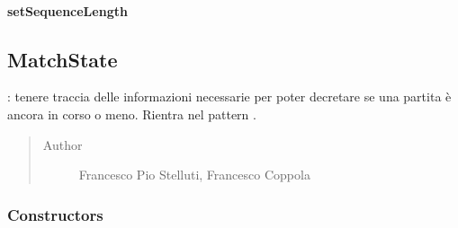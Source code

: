\documentclass[letterpaper,10pt,italian,openany,oneside]{sphinxmanual}
\begin{document}
\paragraph{setSequenceLength}
\label{\detokenize{source/it/unicam/cs/pa/mastermind/gamecore/MatchStartSettings:setsequencelength}}

\begin{fulllineitems}
\label{\detokenize{source/it/unicam/cs/pa/mastermind/gamecore/MatchStartSettings:it.unicam.cs.pa.mastermind.gamecore.MatchStartSettings.setSequenceLength(int)}}
\end{fulllineitems}



\subsection{MatchState}
\label{\detokenize{source/it/unicam/cs/pa/mastermind/gamecore/MatchState:matchstate}}\label{\detokenize{source/it/unicam/cs/pa/mastermind/gamecore/MatchState::doc}}

\begin{fulllineitems}
\label{\detokenize{source/it/unicam/cs/pa/mastermind/gamecore/MatchState:it.unicam.cs.pa.mastermind.gamecore.MatchState}}
: tenere traccia delle informazioni necessarie per poter decretare se una partita è ancora in corso o meno. Rientra nel pattern .
\begin{quote}\begin{description}
\item[{Author}] \leavevmode
Francesco Pio Stelluti, Francesco Coppola

\end{description}\end{quote}

\end{fulllineitems}



\subsubsection{Constructors}
\label{\detokenize{source/it/unicam/cs/pa/mastermind/gamecore/MatchState:constructors}}
\end{document}
